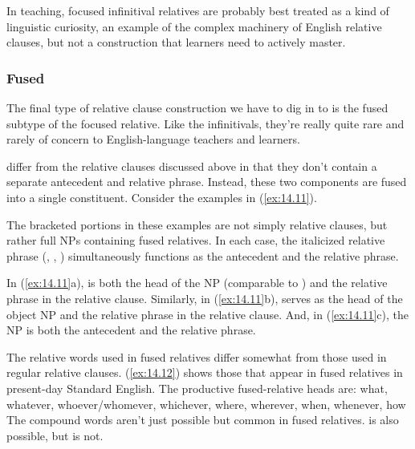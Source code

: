 In teaching, focused infinitival relatives are probably best treated as a kind of linguistic curiosity, an example of the complex machinery of English relative clauses, but not a construction that learners need to actively master.

\subsubsection*{Fused}

The final type of relative clause construction we have to dig in to is the fused subtype of the focused relative. Like the infinitivals, they're really quite rare and rarely of concern to English-language teachers and learners.

 differ from the relative clauses discussed above in that they don't contain a separate antecedent and relative phrase. Instead, these two components are fused into a single constituent. Consider the examples in (\ref{ex:14.11}).

\ea \label{ex:14.11}
    \z
\z
The bracketed portions in these examples are not simply relative clauses, but rather full NPs containing fused relatives. In each case, the italicized relative phrase (, , ) simultaneously functions as the antecedent and the relative phrase.

In (\ref{ex:14.11}a),  is both the head of the NP (comparable to ) and the relative phrase in the relative clause. Similarly, in (\ref{ex:14.11}b),  serves as the head of the object NP and the relative phrase in the relative clause. And, in (\ref{ex:14.11}c), the NP  is both the antecedent and the relative phrase.

The relative words used in fused relatives differ somewhat from those used in regular relative clauses. (\ref{ex:14.12}) shows those that appear in fused relatives in present-day Standard English. The productive fused-relative heads are:
\ea \label{ex:14.12}
what, whatever, whoever/whomever, whichever, where, wherever, when, whenever, how
\z
The compound  words aren't just possible but common in fused relatives.  is also possible, but  is not.

